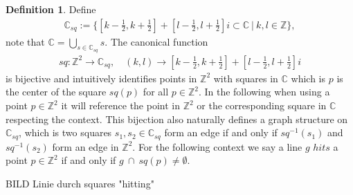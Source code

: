 \documentclass[12pt,a4paper]{scrartcl}
\numberwithin{equation}{subsection}
\newcommand{\C}{\mathbb{C}} %
\newcommand{\1}{\mathbbm{1}}
\numberwithin{equation}{section}
\theoremstyle{definition}
\newtheorem{definition}{Definition}[subsection]
\begin{document}
\begin{definition} \label{squares}
	Define 
	\begin{align}
		\C_{sq} := \{[k - \frac{1}{2}, k + \frac{1}{2}] + [l- \frac{1}{2}, l + \frac{1}{2}]i \subset \C\ |\ k,l \in \mathbb{Z}\}, 
	\end{align} 
	note that $\C = \bigcup_{s\in \C_{sq}} s$. The canonical function
	\begin{align}
	sq: \mathbb{Z}^2 \to \C_{sq},\quad (k,l)\to [k - \frac{1}{2}, k + \frac{1}{2}] + [l- \frac{1}{2}, l + \frac{1}{2}]i
	\end{align}
	is bijective and intuitively identifies points in $\mathbb{Z}^2$ with squares in $\C$ which is $p$ is the center of the square $sq(p)$ for all $p\in \mathbb{Z}^2$. In the following when using a point $p\in \mathbb{Z}^2$ it will reference the point in $\mathbb{Z}^2$ or the corresponding square in $\C$ respecting the context. This bijection also naturally defines a graph structure on $\C_{sq}$, which is two squares $s_1, s_2\in \C_{sq}$ form an edge if and only if $sq^{-1}(s_1)$ and $sq^{-1}(s_2)$ form an edge in $\mathbb{Z}^2$. 
	\noindent For the following context we say a line $g$ $hits$ a point $p\in \mathbb{Z}^2$ if and only if $g\ \cap\ sq(p) \neq \emptyset$. 
	
\end{definition}

BILD Linie durch squares "hitting"\\
\end{document}
